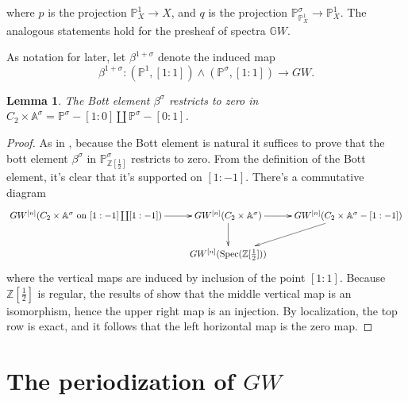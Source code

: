 \documentclass[edeposit,fullpage]{uiucthesis2009}
\newcommand{\Z}{\mathbb Z}
\newcommand{\mbb}{\mathbb}
\DeclareMathOperator{\Spec}{Spec}
\theoremstyle{plain}
\newtheorem{lemma}{Lemma}
\numberwithin{lemma}{section}
\theoremstyle{definition}
\begin{document}
where $p$ is the projection $\mbb P^1_X \rightarrow X$, and $q$ is the
projection $\mbb P^\sigma_{\mbb P^1_X} \rightarrow \mbb P^1_X$. The
analogous statements hold for the presheaf of spectra $\mbb GW$.

As notation for later, let $\beta^{1+\sigma}$ denote the induced map
\begin{equation}\label{eq:bott_element}
\beta^{1+\sigma} : (\mbb P^1,[1:1]) \wedge (\mbb P^\sigma,[1:1])
\rightarrow GW.
\end{equation}

\begin{lemma}\label{lem:bott_zero}
The Bott element $\beta^\sigma$ restricts to zero in $C_2 \times \mbb
A^\sigma = \mbb P^{\sigma} - [1:0] \coprod \mbb P^\sigma - [0:1]$. 
\end{lemma}

\begin{proof}
As in \cite{Schder}, because the Bott element is natural it suffices
to prove that the bott element $\beta^\sigma$ in $\mbb
P^\sigma_{\Z[\frac{1}{2}]}$ restricts to zero. From the definition of
the Bott element, it's clear that it's supported on $[1:-1]$. There's a commutative diagram
\[
\xymatrix{GW^{[n]}(C_2 \times \mbb A^\sigma \text{ on } [1:-1] \coprod
[1:-1]) \ar[r] & GW^{[n]}(C_2 \times \mbb A^\sigma) \ar[r]\ar[d] &
GW^{[n]}(C_2 \times \mbb A^\sigma - [1:-1]) \ar[dl] \\ &
GW^{[n]}(\Spec(\Z[\frac{1}{2}])) &
} 
\]
where the vertical maps are induced by inclusion of the point
$[1:1]$. Because $\Z[\frac{1}{2}]$ is regular, the results of
\cite{Xie2018ATM} show that the middle vertical map is an isomorphism,
hence the upper right map is an injection. By localization, the top
row is exact, and it follows that the left horizontal map is the zero
map. 
\end{proof}


\section{The periodization of $GW$}
\end{document}
